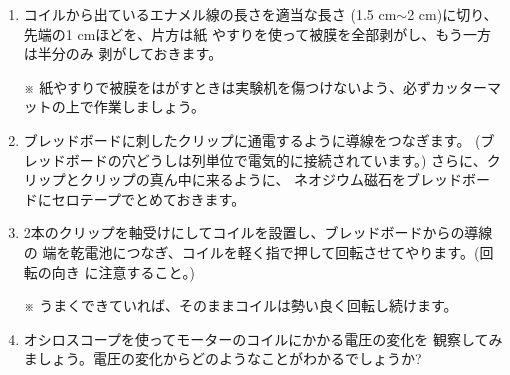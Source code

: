 \begin{enumerate}
\item コイルから出ているエナメル線の長さを適当な長さ
(1.5 cm$\sim$2 cm)に切り、先端の1 cmほどを、片方は紙
やすりを使って被膜を全部剥がし、もう一方は半分のみ
剥がしておきます。

※ 紙やすりで被膜をはがすときは実験机を傷つけないよう、必ずカッターマットの上で作業しましょう。


\item ブレッドボードに刺したクリップに通電するように導線をつなぎます。
(ブレッドボードの穴どうしは列単位で電気的に接続されています。)
さらに、クリップとクリップの真ん中に来るように、
ネオジウム磁石をブレッドボードにセロテープでとめておきます。

\item 2本のクリップを軸受けにしてコイルを設置し、ブレッドボードからの導線の
端を乾電池につなぎ、コイルを軽く指で押して回転させてやります。(回転の向き
に注意すること。)

\hspace*{-\parindent}
※ うまくできていれば、そのままコイルは勢い良く回転し続けます。

\item オシロスコープを使ってモーターのコイルにかかる電圧の変化を
観察してみましょう。電圧の変化からどのようなことがわかるでしょうか?

\end{enumerate}

